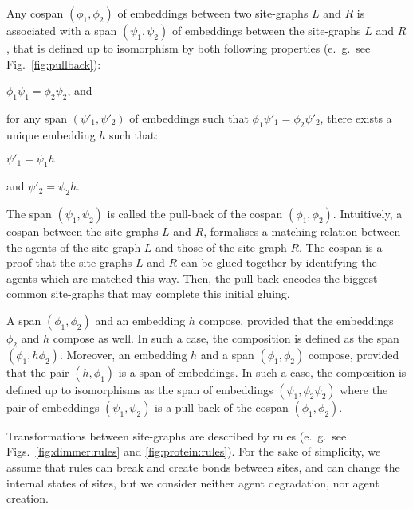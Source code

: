 \documentclass[10pt,a4paper]{llncs}
\newcommand{\keep}[3]{#1{#2}{#3}}
\newcommand{\eg}{e.~g.}
\begin{document}
{Any cospan $(\phi_1,\phi_2)$ of embeddings between two site-graphs $L$ and $R$ is associated with a span $(\psi_1,\psi_2)$ of embeddings between the site-graphs $L$ and $R$, that is defined up to isomorphism by both following properties (\eg~see Fig.~\ref{fig:pullback}): \begin{inparaenum}
\item $\phi_1\psi_1 = \phi_2\psi_2$, and \item for any span $(\psi'_1,\psi'_2)$  of embeddings such that $\phi_1\psi'_1=\phi_2\psi'_2$, there exists a unique embedding $h$ such that: \begin{inparaenum}\item $\psi'_1 = \psi_1 h$ \item and $\psi'_2 = \psi_2 h$. \end{inparaenum}\end{inparaenum}
The span $(\psi_1, \psi_2)$ is called the pull-back
of the cospan $(\phi_1,\phi_2)$. Intuitively, a cospan between the site-graphs $L$ and $R$, formalises a matching relation between the agents of the site-graph $L$ and those of the site-graph $R$. The cospan is a proof that the site-graphs  $L$ and $R$ can be glued together by identifying the agents which are matched this way. Then, the pull-back encodes the biggest common site-graphs that may complete this initial gluing.

A span $(\phi_1,\phi_2)$ and an embedding $h$ compose, provided that the embeddings $\phi_2$ and $h$ compose as well. In such a case, the composition is defined as the span $(\phi_1,h\phi_2)$. Moreover, an embedding $h$ and a span $(\phi_1,\phi_2)$ compose, provided that the pair $(h,\phi_1)$ is a span of embeddings. In such a case, the composition is defined up to isomorphisms as the span of embeddings  $(\psi_1,\phi_2\psi_2)$ where the pair of embeddings  $(\psi_1,\psi_2)$ is a pull-back of the cospan $(\phi_1,\phi_2)$.}

\keep{\pullbackinappendix}{}{\pullbacklong}


Transformations between site-graphs are described by rules (\eg~see Figs.~\ref{fig:dimmer:rules} and \ref{fig:protein:rules}).
For the sake of simplicity, %
we assume that rules can break and create bonds between sites, and can change the internal states of sites, but we consider neither agent degradation, nor agent creation.
\end{document}
